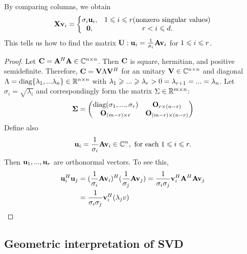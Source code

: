 By comparing columns, we obtain
\begin{align*}
    \bold{X}\bold{v}_i=\left\{\begin{matrix}
        \sigma_i\bold{u}_i,&  1\leqslant i\leqslant r (\text{nonzero singular values})\\
        \bold{0},&  r<i\leqslant d.
       \end{matrix}\right.
\end{align*}
This tells us how to find the matrix $\bold{U}: \bold{u}_i =\frac{1}{\sigma_i}\bold{A}\bold{v}_i$ for $1\leqslant i\leqslant r$.


\begin{proof}
    Let $\bold{C}=\bold{A}^H\bold{A}\in \mathbb{C}^{n\times n}$. Then $\bold{C}$ is square, hermitian, and positive semidefinite.
    Therefore, $\bold{C}=\bold{V}\Lambda\bold{V}^H$ for an unitary $\bold{V}\in \mathbb{C}^{n\times n}$
    and diagonal $\Lambda=\text{diag} \{\lambda_1,...\lambda_n\}\in \mathbb{R}^{n\times n}$ with $\lambda_1\geqslant ...\geqslant \lambda_r>0=\lambda_{r+1}=...=\lambda_n$.
    Let $\sigma_i=\sqrt{\lambda_i}$ and correspondingly form the matrix $\Sigma\in\mathbb{R}^{m\times n}$:
    \begin{align*}
        \bold{\Sigma} = \begin{pmatrix}
            \text{diag}(\sigma_1,...,\sigma_r) &\bold{O}_{r\times (n-r)}\\
            \bold{O}_{(m-r)\times r} &\bold{O}_{(m-r)\times (n-r)}
        \end{pmatrix}
    \end{align*}
    Define also
    \begin{align*}
        \bold{u}_i=\frac{1}{\sigma_i}\bold{A}\bold{v}_i\in\mathbb{C}^n, \text{ for each } 1\leqslant i\leqslant r.
    \end{align*}
    Then $\bold{u}_1,...,\bold{u}_r$ are orthonormal vectors. To see this,
    \begin{align*}
        \bold{u}_i^H\bold{u}_j &= (\frac{1}{\sigma_i} \bold{A}\bold{v}_i)^H (\frac{1}{\sigma_j}\bold{A}\bold{v}_j) = \frac{1}{\sigma_i\sigma_j} \bold{v}_i^H\bold{A}^H\bold{A}\bold{v}_j\\
        &= \frac{1}{\sigma_i\sigma_j} \bold{v}_i^H(\lambda_jv)
    \end{align*}
\end{proof}

\subsection{Geometric interpretation of SVD}

